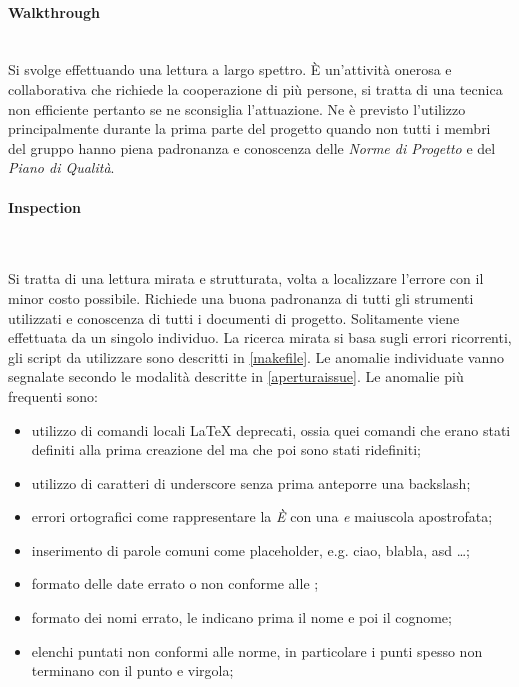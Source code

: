 			\paragraph{Walkthrough} \mbox{} \\
			
			Si svolge effettuando una lettura a largo spettro. È un'attività onerosa e collaborativa che richiede la cooperazione di più persone, si tratta di una tecnica non efficiente pertanto se ne sconsiglia l'attuazione. Ne è previsto l'utilizzo principalmente durante la prima parte del progetto quando non tutti i membri del gruppo hanno piena padronanza e conoscenza delle \emph{Norme di Progetto} e del \emph{Piano di Qualità}.

			\paragraph{Inspection} \mbox{} \\
			\label{anomaliefrequenti}

			Si tratta di una lettura mirata e strutturata, volta a localizzare l'errore con il minor costo possibile. Richiede una buona padronanza di tutti gli strumenti utilizzati e conoscenza di tutti i documenti di progetto. Solitamente viene effettuata da un singolo individuo. La ricerca mirata si basa sugli errori ricorrenti, gli script da utilizzare sono descritti in \ref{makefile}. Le anomalie individuate vanno segnalate secondo le modalità descritte in \ref{aperturaissue}.
			Le anomalie più frequenti sono:
			\begin{itemize}
				\item utilizzo di comandi locali \LaTeX{} deprecati, ossia quei comandi che erano stati definiti alla prima creazione del  ma che poi sono stati ridefiniti;
				\item utilizzo di caratteri di underscore senza prima anteporre una backslash;
				\item errori ortografici come rappresentare la \emph{È} con una \emph{e} maiuscola apostrofata;
				\item inserimento di parole comuni come placeholder, e.g. c{}i{}a{}o, b{}l{}a{}b{}l{}a, a{}s{}d \dots; %
				\item formato delle date errato o non conforme alle \NormeDiProgetto{};
				\item formato dei nomi errato, le \NormeDiProgetto{} indicano prima il nome e poi il cognome;
				\item elenchi puntati non conformi alle norme, in particolare i punti spesso non terminano con il punto e virgola;
				

			\end{itemize}
			
